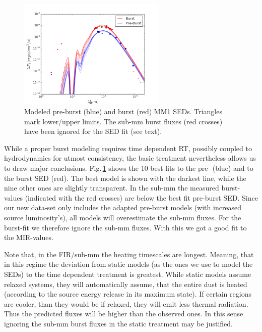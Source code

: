 \documentclass[longauth,usenatbib]{aa}
\begin{document}
 
\begin{figure}   %
	\centering
	\includegraphics[width=7cm]{G358_ap5noALMA.png}
	\caption{Modeled pre-burst (blue) and burst (red) MM1 SEDs. Triangles mark lower/upper limits. The sub-mm burst fluxes (red crosses) have been ignored for the SED fit (see text).
	}
 \label{fig:sed g358}
\end{figure}

While a proper burst modeling requires time dependent RT, possibly coupled to hydrodynamics for utmost consistency, the basic treatment nevertheless allows us to draw major conclusions.
Fig.\,\ref{fig:sed g358} shows the 10 best fits to the pre- (blue) and to the burst SED (red). The best model is shown with the darkest line, while the nine other ones are slightly transparent.
In the sub-mm the measured burst-values (indicated with the red crosses) are below the best fit pre-burst SED. Since our new data-set only includes the adapted pre-burst models (with increased source luminosity's), all models will overestimate the sub-mm fluxes. For the burst-fit we therefore ignore the sub-mm fluxes. With this we got a good fit to the MIR-values. 

Note that, in the FIR/sub-mm the heating timescales are longest. Meaning, that in this regime the deviation from static models (as the ones we use to model the SEDs) to the time dependent treatment is greatest. While static models assume relaxed systems, they will automatically assume, that the entire dust is heated (according to the source energy release in its maximum state). If certain regions are cooler, than they would be if relaxed, they will emit less thermal radiation. Thus the predicted fluxes will be higher than the observed ones. In this sense ignoring the sub-mm burst fluxes in the static treatment may be justified.
\end{document}
